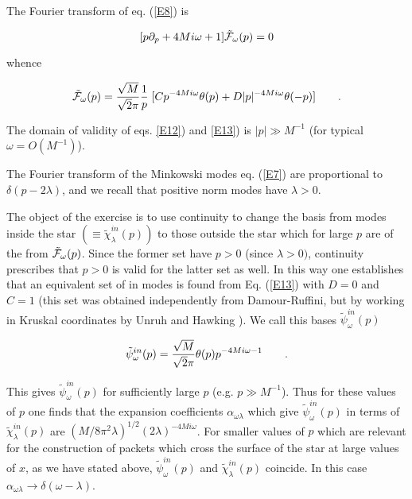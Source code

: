 \documentclass[12pt]{article}
\begin{document}
The Fourier transform of  eq. (\ref{E8}) is

\begin{equation}
\label{E12}
[ p \partial_p +  4 M i \omega + 1  ] {\tilde {\cal F}}_\omega (p) = 0
\end{equation}

\noindent whence

\begin{equation}
\label{E13}
{\tilde{\cal F}}_\omega (p) = {\sqrt{M} \over \sqrt{2} \pi}{1 \over p } \; [ C
p^{-4 M i \omega} \theta (p) + D \vert p \vert^{-4 M i \omega} \theta (-p) ]
\qquad .
\end{equation}



\noindent The domain of validity of eqs. \ref{E12}) and \ref{E13}) is $ \vert p
\vert \gg   M^{-1}$ (for typical $\omega = O(M^{-1})$).

The Fourier transform of the Minkowski modes  eq. (\ref{E7}) are proportional 
to $ \delta (p
- 2 \lambda)$, and we 
recall that positive norm modes have $ \lambda > 0$.


 The object of the exercise is to use continuity to change the basis
from modes inside the star $ \left( \equiv \tilde \chi_\lambda^{in}(p)\right)$
to those outside the star which for large $p$ are of the from $ {\tilde {\cal
F}} _\omega (p)$. Since the former set have $ p > 0$ (since $ \lambda > 0)$,
continuity prescribes that $ p > 0$ is valid for the latter set as well. In
this way one establishes that an equivalent set of in modes is found from Eq.
(\ref{E13}) with $ D = 0$ and $C=1$ (this set was obtained independently 
from Damour-Ruffini, but by working in Kruskal coordinates by
Unruh \cite{Unru1} and Hawking \cite{Hawk3}). We call this bases $ {\tilde
\psi}_{\omega}^{in} (p)$

\begin{equation}
\label{E14}
{\tilde {\psi}}_\omega ^{in} (p) = {\sqrt{M} \over \sqrt{2} \pi}
 \theta (p)  p^{-4
M i \omega - 1} \qquad .
\end{equation}


\noindent This gives $ {\tilde{\psi}}_\omega ^{in} (p)$ for sufficiently large
$p$ (e.g. $ p \gg M^{-1}$). Thus for these
values of $p$ one finds that the expansion coefficients $ \alpha _{\omega
\lambda}$ which give $ {\tilde{\psi}}_ \omega ^{in} (p)$ in terms of $ {\tilde
{\chi}}_\lambda^{in} (p)$ are $ (M/ 8 \pi^2 \lambda)^{1/2} ( 2 \lambda)^{- 4 M
i \omega}$. 
For smaller values
of $p$ which are relevant for the construction of packets
which cross the surface of the star at large values of $x$, as we have stated
above, $ {\tilde{\psi}}_\omega^{in} (p)$ and $ {\tilde{\chi}}_\lambda^{in}
(p)$ coincide. In this case $ \alpha_{\omega \lambda} \to \delta (\omega -
\lambda)$.
\end{document}
